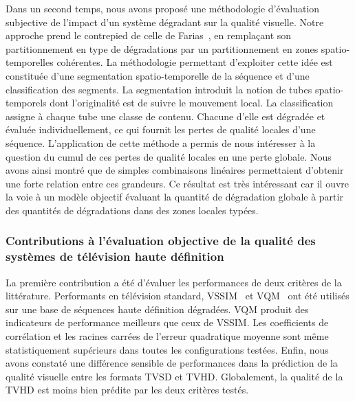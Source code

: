 Dans un second temps, nous avons proposé une méthodologie d'évaluation subjective de l'impact d'un système dégradant sur la qualité visuelle. Notre approche prend le contrepied de celle de Farias~\cite{farias-phd}, en remplaçant son partitionnement en type de dégradations par un partitionnement en zones spatio-temporelles cohérentes. La méthodologie permettant d'exploiter cette idée est constituée d'une segmentation spatio-temporelle de la séquence et d'une classification des segments. La segmentation introduit la notion de tubes spatio-temporels dont l'originalité est de suivre le mouvement local. La classification assigne à chaque tube une classe de contenu. Chacune d'elle est dégradée et évaluée individuellement, ce qui fournit les pertes de qualité locales d'une séquence. L'application de cette méthode a permis de nous intéresser à la question du cumul de ces pertes de qualité locales en une perte globale. Nous avons ainsi montré que de simples combinaisons linéaires permettaient d'obtenir une forte relation entre ces grandeurs. Ce résultat est très intéressant car il ouvre la voie à un modèle objectif évaluant la quantité de dégradation globale à partir des quantités de dégradations dans des zones locales typées.


\subsubsection*{Contributions à l'évaluation objective de la qualité des systèmes de télévision haute définition}
La première contribution a été d'évaluer les performances de deux critères de la littérature. Performants en télévision standard, VSSIM~\cite{wang-vqasdm} et VQM~\cite{wolf-vqmtech} ont été utilisés sur une base de séquences haute définition dégradées. VQM produit des indicateurs de performance meilleurs que ceux de VSSIM. Les coefficients de corrélation et les racines carrées de l'erreur quadratique moyenne sont même statistiquement supérieurs dans toutes les configurations testées. Enfin, nous avons constaté une différence sensible de performances dans la prédiction de la qualité visuelle entre les formats TVSD et TVHD. Globalement, la qualité de la TVHD est moins bien prédite par les deux critères testés.

\bigskip

